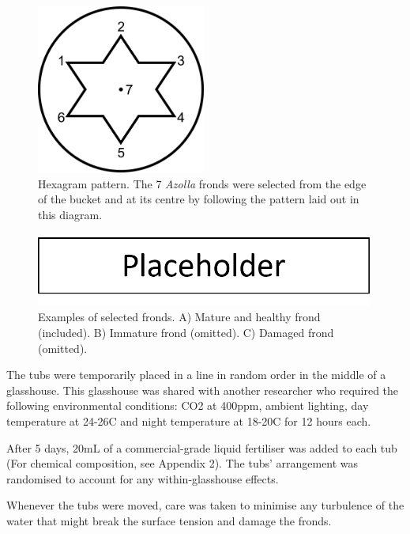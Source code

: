 \begin{bibunit}
\begin{figure}[H]
  \centering
  \includegraphics[width = 15em]{img/hexagram.png}
  \caption{Hexagram pattern. The 7 \textit{Azolla} fronds were selected from the edge of the bucket and at its centre by following the pattern laid out in this diagram.}
  \label{fig:hexagram}
\end{figure}

\begin{figure}[H]
  \centering
  \includegraphics[width = 30em]{img/frond_examples.png}
  \caption{Examples of selected fronds. A) Mature and healthy frond (included). B) Immature frond (omitted). C) Damaged frond (omitted).}
  \label{fig:frond_examples}
\end{figure}

The tubs were temporarily placed in a line in random order in the middle of a glasshouse. This glasshouse was shared with another researcher who required the following environmental conditions: CO2 at 400ppm, ambient lighting, day temperature at 24-26\textdegree C and night temperature at 18-20\textdegree C for 12 hours each.

\vspace{1em}
After 5 days, 20mL of a commercial-grade liquid fertiliser was added to each tub (For chemical composition, see Appendix 2). The tubs’ arrangement was randomised to account for any within-glasshouse effects.

\vspace{1em}
Whenever the tubs were moved, care was taken to minimise any turbulence of the water that might break the surface tension and damage the fronds.


\putbib

\end{bibunit}
